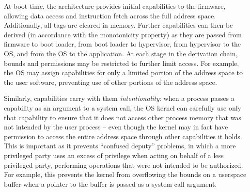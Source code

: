 \documentclass[12pt,twoside,openright,usletter]{article}
\newcommand{\note}[2]{{\color{blue}[ Note: #1 - #2]}}
\renewcommand{\note}[2]{\relax\ifhmode\unskip\fi}
\newcommand{\rwnote}[1]{\note{#1}{Robert W.}}
\newcommand{\psnote}[1]{\note{#1}{Peter S.}}
\newcommand{\pgnnote}[1]{\note{#1}{Peter N.}}
\begin{document}
\begin{description}
  
\end{description}

At boot time, the architecture provides initial capabilities to the firmware,
allowing data access and instruction fetch across the full address space.
Additionally, all tags are cleared in memory.
Further capabilities can then be derived (in accordance with the monotonicity
property) as they are passed from firmware to boot loader, from boot loader to
hypervisor, from hypervisor to the OS, and from the OS to the application.
At each stage in the derivation chain, bounds and permissions may be
restricted to further limit access.
For example, the OS may assign capabilities for only a limited portion of the
address space to the user software, preventing use of other portions of the
address space.



Similarly, capabilities carry with them \textit{intentionality}: when a
process passes a capability as an argument to a system call, the OS kernel can
carefully use only that capability to ensure that it does not access other
process memory that was not intended by the user process -- even though the
kernel may in fact have permission to access the entire address space through
other capabilities it holds.
This is important as it prevents ``confused deputy'' problems, in which a more
privileged party uses an excess of privilege when acting on behalf of a less
privileged party, performing operations that were not intended to be
authorized.
For example, this prevents the kernel from overflowing the bounds on a
userspace buffer when a pointer to the buffer is passed as a
system-call argument.
\end{document}
